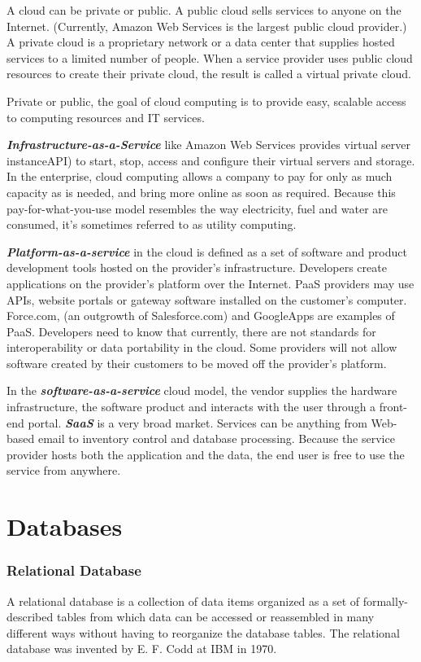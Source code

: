 \documentclass[12pt, a4paper]{report}
\theoremstyle{plain}
\theoremstyle{definition}
\theoremstyle{remark}
\begin{document}
A cloud can be private or public. A public cloud sells services to anyone on the Internet. (Currently, Amazon Web Services is the largest public cloud provider.) A private cloud is a proprietary network or a data center that supplies hosted services to a limited number of people. When a service provider uses public cloud resources to create their private cloud, the result is called a virtual private cloud. 

Private or public, the goal of cloud computing is to provide easy, scalable access to computing resources and IT services.


\textbf{\emph{Infrastructure-as-a-Service}} like Amazon Web Services provides virtual server instanceAPI) to start, stop, access and configure their virtual servers and storage. In the enterprise, cloud computing allows a company to pay for only as much capacity as is needed, and bring more online as soon as required. Because this pay-for-what-you-use model resembles the way electricity, fuel and water are consumed, it's sometimes referred to as utility computing.


\textbf{\emph{Platform-as-a-service}} in the cloud is defined as a set of software and product development tools hosted on the provider's infrastructure. Developers create applications on the provider's platform over the Internet. PaaS providers may use APIs, website portals or gateway software installed on the customer's computer. Force.com, (an outgrowth of Salesforce.com) and GoogleApps are examples of PaaS. Developers need to know that currently, there are not standards for interoperability or data portability in the cloud. Some providers will not allow software created by their customers to be moved off the provider's platform.


In the \textbf{\emph{software-as-a-service}} cloud model, the vendor supplies the hardware infrastructure, the software product and interacts with the user through a front-end portal. \textbf{\emph{SaaS}} is a very broad market. Services can be anything from Web-based email to inventory control and database processing. Because the service provider hosts both the application and the data, the end user is free to use the service from anywhere.





\chapter{Databases}
\subsection{Relational Database}
A relational database is a collection of data items organized as a set of formally-described tables from which data can be accessed or reassembled in many different ways without having to reorganize the database tables. The relational database was invented by E. F. Codd at IBM in 1970.
\end{document}
